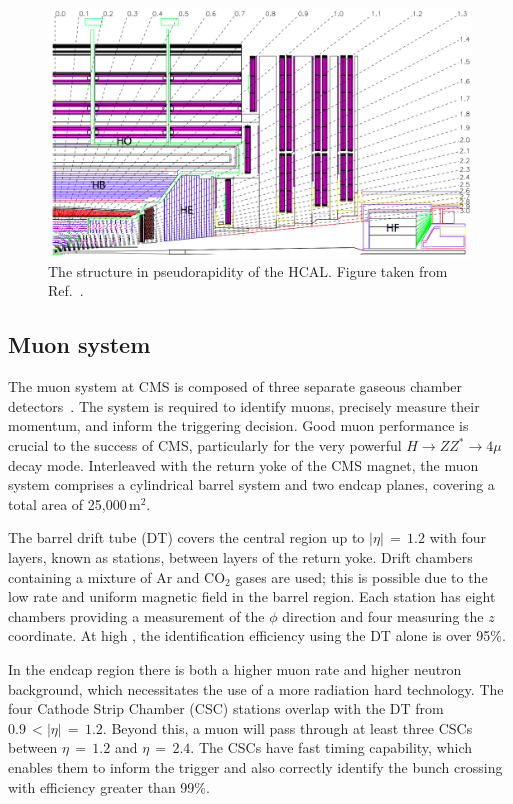 \begin{figure}[h!]
  \centering
  \includegraphics[width=\textwidth]{Figures/Detector/HCAL.png}
  \caption[The structure in pseudorapidity of the CMS HCAL.]
  {
    The structure in pseudorapidity of the HCAL.
    Figure taken from Ref.~\cite{CMSdetector}.
  }
  \label{fig:detector_HCAL}
\end{figure}

\subsection{Muon system}

The muon system at CMS is composed of three separate gaseous chamber detectors~\cite{CMSdetector,MuonReco}.
The system is required to identify muons, precisely measure their momentum, and inform the triggering decision.
Good muon performance is crucial to the success of CMS, particularly for the very powerful $H \rightarrow ZZ^* \rightarrow 4\mu$ decay mode.
Interleaved with the return yoke of the CMS magnet, the muon system comprises a cylindrical barrel system and two endcap planes, 
covering a total area of 25,000\,$\textrm{m}^2$.

The barrel drift tube (DT) covers the central region up to $|\eta|\,=\,1.2$ with four layers, known as stations, between layers of the return yoke.
Drift chambers containing a mixture of Ar and $\textrm{CO}_2$ gases are used; this is possible due to the low rate and uniform magnetic field in the barrel region.
Each station has eight chambers providing a measurement of the $\phi$ direction and four measuring the $z$ coordinate.
At high \pt, the identification efficiency using the DT alone is over 95\%.

In the endcap region there is both a higher muon rate and higher neutron background, which necessitates the use of a more radiation hard technology. %
The four Cathode Strip Chamber (CSC) stations overlap with the DT from $0.9\,<|\eta|\,=\,1.2$.
Beyond this, a muon will pass through at least three CSCs between $\eta\,=\,1.2$ and $\eta\,=\,2.4$.
The CSCs have fast timing capability, which enables them to inform the trigger and also correctly identify the bunch crossing with efficiency greater than 99\%.

